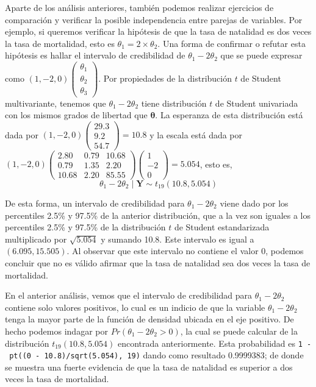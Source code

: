 \documentclass[
  10pt,
  spanish,
]{book}
\theoremstyle{definition}
\theoremstyle{definition}
\theoremstyle{definition}
\theoremstyle{definition}
\theoremstyle{remark}
\begin{document}
Aparte de los análisis anteriores, también podemos realizar ejercicios de comparación y verificar la posible independencia entre parejas de variables. Por ejemplo, si queremos verificar la hipótesis de que la tasa de natalidad es dos veces la tasa de mortalidad, esto es \(\theta_1=2 \times \theta_2\). Una forma de confirmar o refutar esta hipótesis es hallar el intervalo de credibilidad de \(\theta_1 - 2\theta_2\) que se puede expresar como \((1,-2,0)\begin{pmatrix}\theta_1\\ \theta_2\\ \theta_3\end{pmatrix}\). Por propiedades de la distribución \(t\) de Student multivariante, tenemos que \(\theta_1 - 2 \theta_2\) tiene distribución \(t\) de Student univariada con los mismos grados de libertad que \(\boldsymbol \theta\). La esperanza de esta distribución está dada por \((1,-2,0)\begin{pmatrix}29.3\\9.2\\54.7\end{pmatrix}=10.8\) y la escala está dada por \((1,-2,0)\begin{pmatrix}2.80&0.79&10.68\\0.79&1.35&2.20\\10.68&2.20&85.55\end{pmatrix}\begin{pmatrix}1\\-2\\0\end{pmatrix}=5.054\), esto es,
\begin{equation*}
\theta_1-2\theta_2 \mid \mathbf{Y}\sim t_{19}(10.8, 5.054)
\end{equation*}

De esta forma, un intervalo de credibilidad para \(\theta_1-2\theta_2\) viene dado por los percentiles 2.5\% y 97.5\% de la anterior distribución, que a la vez son iguales a los percentiles 2.5\% y 97.5\% de la distribución \(t\) de Student estandarizada multiplicado por \(\sqrt{5.054}\) y sumando 10.8. Este intervalo es igual a \((6.095, 15.505)\). Al observar que este intervalo no contiene el valor 0, podemos concluir que no es válido afirmar que la tasa de natalidad sea dos veces la tasa de mortalidad.

En el anterior análisis, vemos que el intervalo de credibilidad para \(\theta_1-2\theta_2\) contiene solo valores positivos, lo cual es un indicio de que la variable \(\theta_1-2\theta_2\) tenga la mayor parte de la función de densidad ubicada en el eje positivo. De hecho podemos indagar por \(Pr(\theta_1-2\theta_2>0)\), la cual se puede calcular de la distribución \(t_{19}(10.8, 5.054)\) encontrada anteriormente. Esta probabilidad es \texttt{1\ -\ pt((0\ -\ 10.8)/sqrt(5.054),\ 19)} dando como resultado 0.9999383; de donde se muestra una fuerte evidencia de que la tasa de natalidad es superior a dos veces la tasa de mortalidad.
\end{document}
